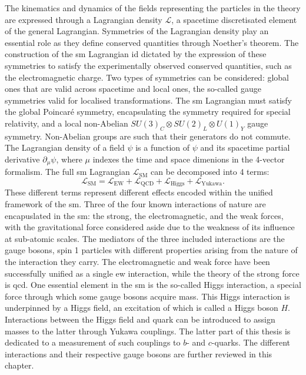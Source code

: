 The kinematics and dynamics of the fields representing the particles in the theory are expressed through a Lagrangian density $\mathcal{L}$, a spacetime discretisated element of the general Lagrangian. Symmetries of the Lagrangian density play an essential role as they define conserved quantities through Noether's theorem. The construction of the \gls{sm} Lagrangian id dictated by the expression of these symmetries to satisfy the experimentally observed conserved quantities, such as the electromagnetic charge. Two types of symmetries can be considered: global ones that are valid across spacetime and local ones, the so-called gauge symmetries valid for localised transformations. The \gls{sm} Lagrangian must satisfy the global Poincaré symmetry, encapsulating the symmetry required for special relativity, and a local non-Abelian $SU(3)_C \otimes SU(2)_L \otimes U(1)_Y$ gauge symmetry. Non-Abelian groups are such that their generators do not commute. The Lagrangian density of a field $\psi$ is a function of $\psi$ and its spacetime partial derivative $\partial_{\mu} \psi$, where $\mu$ indexes the time and space dimenions in the 4-vector formalism. The full \gls{sm} Lagrangian $\mathcal{L}_{\text{SM}}$ can be decomposed into 4 terms:
\begin{equation}\label{eq-SMGlobal}
    \mathcal{L}_{\text{SM}} = \mathcal{L}_{\text{EW}} + \mathcal{L}_{\text{QCD}} + \mathcal{L}_{\text{Higgs}} + \mathcal{L}_{\text{Yukawa}}.
\end{equation}
These different terms represent different effects encoded within the unified framework of the \gls{sm}. Three of the four known interactions of nature are encapuslated in the \gls{sm}: the strong, the electromagnetic, and the weak forces, with the gravitational force considered aside due to the weakness of its influence at sub-atomic scales. The mediators of the three included interactions are the gauge bosons, spin 1 particles with different properties arising from the nature of the interaction they carry. The electromagnetic and weak force have been successfully unified as a single \gls{ew} interaction, while the theory of the strong force is \gls{qcd}. One essential element in the \gls{sm} is the so-called Higgs interaction, a special force through which some gauge bosons acquire mass. This Higgs interaction is underpinned by a Higgs field, an excitation of which is called a Higgs boson $H$. Interactions between the Higgs field and quark can be introduced to assign masses to the latter through Yukawa couplings. The latter part of this thesis is dedicated to a measurement of such couplings to $b$- and $c$-quarks. The different interactions and their respective gauge bosons are further reviewed in this chapter.

